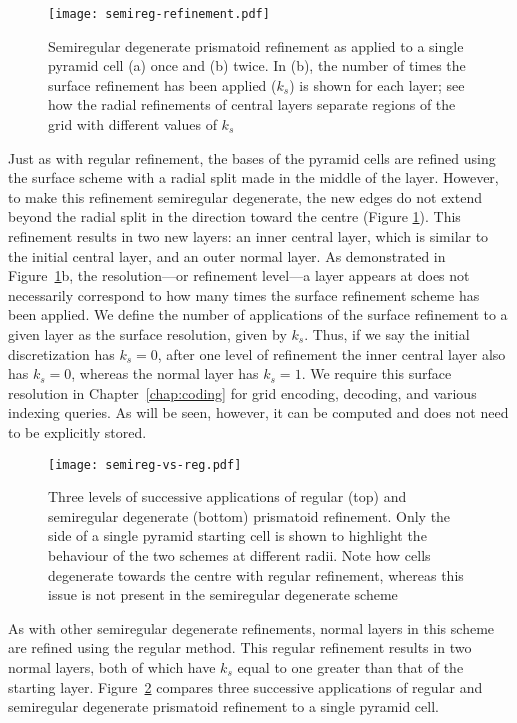 \begin{figure}[ht!]
	\centering
	\texttt{[image: semireg-refinement.pdf]}
	\caption[Semiregular degenerate prismatoid refinement]{
		Semiregular degenerate prismatoid refinement as applied to a single pyramid cell (a) once and (b) twice.
		In (b), the number of times the surface refinement has been applied ($k_s$) is shown for each layer; see how the radial refinements of central layers separate regions of the grid with different values of $k_s$}
	\label{fig:semiregular}
\end{figure}


Just as with regular refinement, the bases of the pyramid cells are refined using the surface scheme with a radial split made in the middle of the layer.
However, to make this refinement semiregular degenerate, the new edges do not extend beyond the radial split in the direction toward the centre (Figure \ref{fig:semiregular}).
This refinement results in two new layers: an inner central layer, which is similar to the initial central layer, and an outer normal layer.
As demonstrated in Figure~\ref{fig:semiregular}b, the resolution---or refinement level---a layer appears at does not necessarily correspond to how many times the surface refinement scheme has been applied.
We define the number of applications of the surface refinement to a given layer as the surface resolution, given by $k_s$.
Thus, if we say the initial discretization has $k_s = 0$, after one level of refinement the inner central layer also has $k_s = 0$, whereas the normal layer has $k_s = 1$.
We require this surface resolution in Chapter~\ref{chap:coding} for grid encoding, decoding, and various indexing queries. As will be seen, however, it can be computed and does not need to be explicitly stored.


\begin{figure}[ht!]
	\centering
	\texttt{[image: semireg-vs-reg.pdf]}
	\caption[Comparison of regular and semiregular degenerate prismatoid refinement]{
		Three levels of successive applications of regular (top) and semiregular degenerate (bottom) prismatoid refinement.
		Only the side of a single pyramid starting cell is shown to highlight the behaviour of the two schemes at different radii.
		Note how cells degenerate towards the centre with regular refinement, whereas this issue is not present in the semiregular degenerate scheme
	}
	\label{fig:semireg-vs-reg}
\end{figure}


As with other semiregular degenerate refinements, normal layers in this scheme are refined using the regular method.
This regular refinement results in two normal layers, both of which have $k_s$ equal to one greater than that of the starting layer.
Figure~\ref{fig:semireg-vs-reg} compares three successive applications of regular and semiregular degenerate prismatoid refinement to a single pyramid cell.


